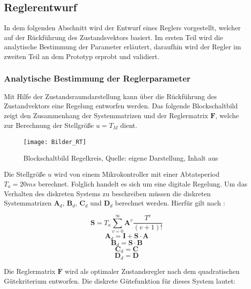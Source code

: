 \subsection{Reglerentwurf}
In dem folgenden Abschnitt wird der Entwurf eines Reglers vorgestellt, welcher auf der Rückführung des Zustandsvektors basiert. Im ersten Teil wird die analytische Bestimmung der Parameter erläutert, daraufhin wird der Regler im zweiten Teil an dem Prototyp erprobt und validiert.

\subsubsection{Analytische Bestimmung der Reglerparameter}
Mit Hilfe der Zustandsraumdarstellung kann über die Rückführung des Zustandvektors eine Regelung entworfen werden. Das folgende Blockschaltbild zeigt den Zusammenhang der Systemmatrizen und der Reglermatrix $\textbf{F}$, welche zur Berechnung der Stellgröße $u=T_M$ dient.

\begin{figure}[h]
\label{Regelkreis_pic}
\texttt{[image: Bilder\_RT]}
\caption{Blockschaltbild Regelkreis, Quelle: eigene Darstellung, Inhalt aus \cite{RT2}}
\end{figure}

Die Stellgröße $u$ wird von einem Mikrokontroller mit einer Abtatsperiod $T_a = 20ms$ berechnet. Folglich handelt es sich um eine digitale Regelung. Um das Verhalten des diskreten Systems zu beschreiben müssen die diskreten Systemmatrizen $\textbf{A}_d$, $\textbf{B}_d$, $\textbf{C}_d$ und $\textbf{D}_d$ berechnet werden. Hierfür gilt nach \cite{RT2}:

\begin{equation}
\textbf{S} = T_a \sum_{v=0}^{\infty} \textbf{A}^v \frac{T^v}{(v+1)!}
\end{equation}
\begin{equation}
\textbf{A}_d = \textbf{I} + \textbf{S} \cdot \textbf{A}
\end{equation}
\begin{equation}
\textbf{B}_d = \textbf{S} \cdot \textbf{B}
\end{equation}
\begin{equation}
\textbf{C}_d = \textbf{C}
\end{equation}
\begin{equation}
\textbf{D}_d = \textbf{D}
\end{equation}

Die Reglermatrix $\textbf{F}$ wird als optimaler Zustandsregler nach dem quadratischen Gütekriterium entworfen. Die diskrete Gütefunktion für dieses System lautet:

